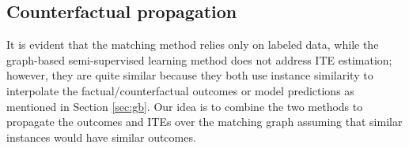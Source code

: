 
\subsection{Counterfactual propagation}

It is evident that the matching method relies only on labeled data, while the graph-based semi-supervised learning method does not address ITE estimation; however, 
they are quite similar because they  both use instance similarity to interpolate the  factual/counterfactual outcomes or model predictions as mentioned in Section \ref{sec:gb}.
Our idea is to combine the two methods to propagate the outcomes and ITEs over the matching graph assuming that similar instances would have similar outcomes.

